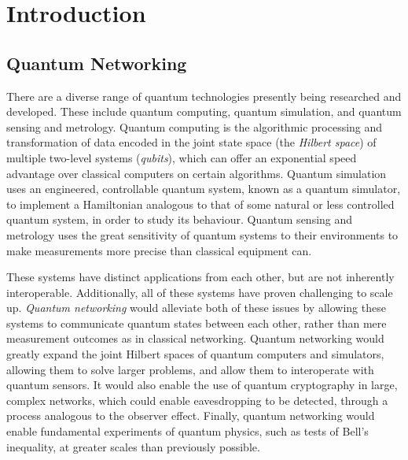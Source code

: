 \chapter{Introduction}

\section{Quantum Networking}
There are a diverse range of quantum technologies presently being researched and developed. These include quantum computing\cite{divincenzo_2000}, quantum simulation\cite{macdonell_2021}, and quantum sensing and metrology\cite{giovannetti_2004}. Quantum computing is the algorithmic processing and transformation of data encoded in the joint state space (the \textit{Hilbert space}) of multiple two-level systems (\textit{qubits}), which can offer an exponential speed advantage over classical computers on certain algorithms. Quantum simulation uses an engineered, controllable quantum system, known as a quantum simulator, to implement a Hamiltonian analogous to that of some natural or less controlled quantum system, in order to study its behaviour. Quantum sensing and metrology uses the great sensitivity of quantum systems to their environments to make measurements more precise than classical equipment can.

These systems have distinct applications from each other, but are not inherently interoperable. Additionally, all of these systems have proven challenging to scale up. \textit{Quantum networking} would alleviate both of these issues by allowing these systems to communicate quantum states between each other, rather than mere measurement outcomes as in classical networking. Quantum networking would greatly expand the joint Hilbert spaces of quantum computers and simulators, allowing them to solve larger problems, and allow them to interoperate with quantum sensors. It would also enable the use of quantum cryptography\cite{bennett_brassard_2014,yin_2016} in large, complex networks, which could enable eavesdropping to be detected, through a process analogous to the observer effect. Finally, quantum networking would enable fundamental experiments of quantum physics, such as tests of Bell's inequality, at greater scales than previously possible\cite{rosenfeld_2017}.


